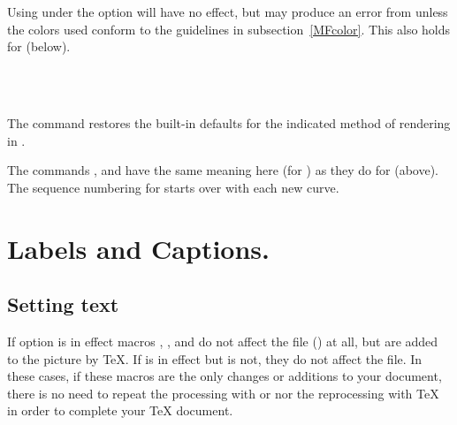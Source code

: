 \documentclass[letterpaper]{article}
\begin{document}
Using  under the  option
will have no effect, but may produce an error from \MF{} unless the
colors used conform to the guidelines in subsection~\ref{MFcolor}.
This also holds for  (below).

\begin{cd}
\\
\\
\end{cd}

The command  restores the built-in defaults for the
indicated method of rendering in .

The commands ,  and  have the
same meaning here (for ) as they do for 
(above). The sequence numbering for  starts over with each
new curve.


\section{Labels and Captions.}\label{labels}

\subsection{Setting text}\label{text}

If option  is in effect macros , ,
 and  do not affect the \MF{} file
() at all, but are added to the picture by \TeX{}. If
 is in effect but  is not, they do not
affect the \MP{} file. In these cases, if these macros are the only
changes or additions to your document, there is no need to repeat the
processing with \MF{} or \MP{} nor the reprocessing with \TeX{} in order
to complete your \TeX{} document.

\begin{cd}
\\
\\
%
%
\end{cd}
\end{document}
